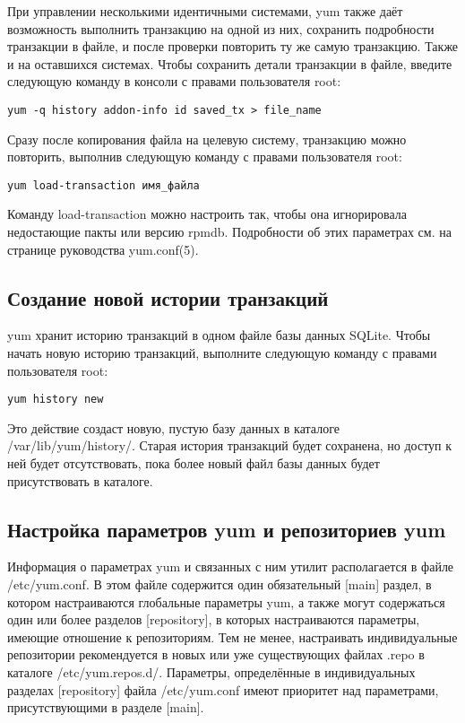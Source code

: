 \documentclass[a4paper,10pt,twoside]{article}
\begin{document}
При управлении несколькими идентичными системами, yum также даёт возможность выполнить транзакцию на одной из них, сохранить подробности транзакции в файле, и после проверки повторить ту же самую транзакцию.  Также и на оставшихся системах. Чтобы сохранить детали транзакции в файле, введите следующую команду в консоли с правами пользователя root: 

\begin{verbatim}
yum -q history addon-info id saved_tx > file_name
\end{verbatim} 

Сразу после копирования файла на целевую систему, транзакцию можно повторить, выполнив следующую команду с правами пользователя root: 
\begin{verbatim}
yum load-transaction имя_файла\end{verbatim} 

Команду load-transaction можно настроить так, чтобы она игнорировала недостающие пакты или версию rpmdb. Подробности об этих параметрах см. на странице руководства yum.conf(5).

\subsection{Создание новой истории транзакций}
yum хранит историю транзакций в одном файле базы данных SQLite. Чтобы начать новую историю транзакций, выполните следующую команду с правами пользователя root: 

\begin{verbatim}
yum history new\end{verbatim} 

Это действие создаст новую, пустую  базу данных в каталоге /var/lib/yum/history/. Старая история транзакций будет сохранена, но доступ к ней будет отсутствовать, пока более новый файл базы данных будет присутствовать в каталоге.


\subsection{Настройка параметров yum и репозиториев yum}
Информация о параметрах yum и связанных с ним утилит располагается в файле /etc/yum.conf. В этом файле содержится один обязательный [main] раздел, в котором настраиваются глобальные параметры yum, а также могут содержаться один или более разделов [repository], в которых настраиваются параметры, имеющие отношение к репозиториям. Тем не менее, настраивать индивидуальные репозитории рекомендуется в новых или уже существующих файлах .repo в каталоге /etc/yum.repos.d/. Параметры, определённые в индивидуальных разделах [repository] файла /etc/yum.conf имеют приоритет над параметрами, присутствующими в разделе [main].
\end{document}

